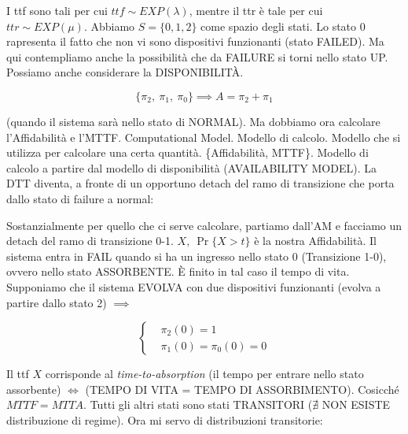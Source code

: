 I ttf sono tali per cui $ttf \sim EXP(\lambda)$, mentre il ttr è tale per cui $ttr \sim EXP(\mu)$. Abbiamo $S=\{0,1,2\}$ come spazio degli stati. Lo stato 0 rapresenta il fatto che non vi sono dispositivi funzionanti (stato FAILED). Ma qui contempliamo anche la possibilità che da FAILURE si torni nello stato UP. Possiamo anche considerare la DISPONIBILIT\`A.

\[
	\{\pi_2,\ \pi_1,\ \pi_0\} \implies A = \pi_2+\pi_1
\]

(quando il sistema sarà nello stato di NORMAL). Ma dobbiamo ora calcolare l'Affidabilità e l'MTTF. Computational Model. Modello di calcolo. Modello che si utilizza per calcolare una certa quantità. \{Affidabilità, MTTF\}. Modello di calcolo a partire dal modello di disponibilità (AVAILABILITY MODEL). La DTT diventa, a fronte di un opportuno detach del ramo di transizione che porta dallo stato di failure a normal:

\begin{center}
\end{center}

Sostanzialmente per quello che ci serve calcolare, partiamo dall'AM e facciamo un detach del ramo di transizione 0-1. $X,\ \Pr\{X > t\}$ è la nostra Affidabilità. Il sistema entra in FAIL quando si ha un ingresso nello stato 0 (Transizione 1-0), ovvero nello stato ASSORBENTE. \`E finito in tal caso il tempo di vita. Supponiamo che il sistema EVOLVA con due dispositivi funzionanti (evolva a partire dallo stato 2) $\implies$

\[
	\left\{
	\begin{aligned}
	&\pi_2(0)=1\\
	&\pi_1(0)=\pi_0(0)=0
	\end{aligned}
	\right.
\] 

Il ttf $X$ corrisponde al \textit{time-to-absorption} (il tempo per entrare nello stato assorbente) $\iff$ (TEMPO DI VITA = TEMPO DI ASSORBIMENTO). Cosicché $MTTF=MTTA$. Tutti gli altri stati sono stati TRANSITORI ($\nexists$ NON ESISTE distribuzione di regime). Ora mi servo di distribuzioni transitorie:

